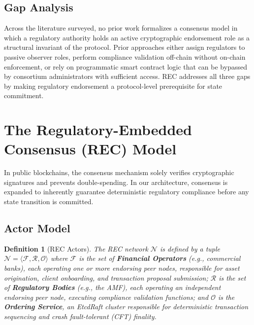 \documentclass[journal,10pt,twocolumn]{IEEEtran}
\newtheorem{definition}{Definition}
\begin{document}
\subsection{Gap Analysis}

Across the literature surveyed, no prior work formalizes a consensus model in which a regulatory authority holds an active cryptographic endorsement role as a structural invariant of the protocol. Prior approaches either assign regulators to passive observer roles, perform compliance validation off-chain without on-chain enforcement, or rely on programmatic smart contract logic that can be bypassed by consortium administrators with sufficient access. REC addresses all three gaps by making regulatory endorsement a protocol-level prerequisite for state commitment.

\section{The Regulatory-Embedded Consensus (REC) Model}
\label{sec:rec}

In public blockchains, the consensus mechanism solely verifies cryptographic signatures and prevents double-spending. In our architecture, consensus is expanded to inherently guarantee deterministic regulatory compliance before any state transition is committed.

\subsection{Actor Model}

\begin{definition}[REC Actors]
The REC network $\mathcal{N}$ is defined by a tuple $\mathcal{N} = \langle \mathcal{F}, \mathcal{R}, \mathcal{O} \rangle$ where $\mathcal{F}$ is the set of \textbf{Financial Operators} (e.g., commercial banks), each operating one or more endorsing peer nodes, responsible for asset origination, client onboarding, and transaction proposal submission; $\mathcal{R}$ is the set of \textbf{Regulatory Bodies} (e.g., the AMF), each operating an independent endorsing peer node, executing compliance validation functions; and $\mathcal{O}$ is the \textbf{Ordering Service}, an EtcdRaft cluster responsible for deterministic transaction sequencing and crash fault-tolerant (CFT) finality.
\end{definition}
\end{document}
